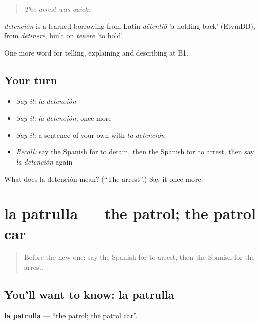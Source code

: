 \begin{quote}
\emph{The arrest was quick.}
\end{quote}

\begin{cousinweb}
\emph{detención} is a learned borrowing from Latin \emph{dētentiō} 'a holding back' (EtymDB), from \emph{dētinēre}, built on \emph{tenēre} 'to hold'.
\end{cousinweb}

\begin{grammarlens}[title={What you've built}]
One more word for telling, explaining and describing at B1.
\end{grammarlens}

\subsection*{Your turn}
\begin{itemize}
\raggedright
  \item \emph{Say it:} \emph{la detención}
  \item \emph{Say it:} \emph{la detención}, once more
  \item \emph{Say it:} a sentence of your own with \emph{la detención}
  \item \emph{Recall:} say the Spanish for to detain, then the Spanish for to arrest, then say \emph{la detención} again
\end{itemize}

\begin{tcolorbox}[breakable,colback=teal!4,colframe=teal!35!black,title={Before you move on}]
What does la detención mean? (\textquotedblleft{}The arrest\textquotedblright{}.) Say it once more.
\end{tcolorbox}
\section[la patrulla]{la patrulla — the patrol; the patrol car}

\label{lesson:ES-C519-patrulla}



\begin{quote}
Before the new one: say the Spanish for to arrest, then the Spanish for the arrest.
\end{quote}

\subsection*{You'll want to know: la patrulla}
\textbf{la patrulla} — \textquotedblleft{}the patrol; the patrol car\textquotedblright{}.


